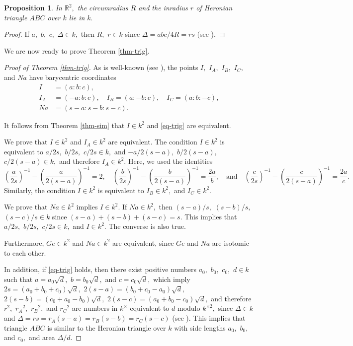 \documentclass{article}
\theoremstyle{definition}
\theoremstyle{plain}
\newtheorem{prop}{Proposition}
\newenvironment{pf}{\begin{proof}}{\end{proof}}
\begin{document}
\begin{prop}
In $\mathbb R^2,$ the circumradius $R$ and the inradius $r$ of Heronian triangle $ABC$ over $k$ lie in $k.$
\end{prop}
\begin{pf}
If $a,$ $b,$ $c,$ $\Delta \in k,$ then $R,$ $r \in k$ since $\Delta = abc/4R = rs$ (see \cite[Section 1.5]{Cox89}).\qedhere
\end{pf}
We are now ready to prove Theorem \ref{thm-trig}.
\begin{pf}[Proof of Theorem \ref{thm-trig}]
As is well-known (see \cite{ETC}), the points $I,$ $I_A,$ $I_B,$ $I_C,$ and $Na$ have barycentric coordinates 
\begin{align*} 
I &= (a:b:c), \\ 
I_A &= (-a:b:c), \quad I_B = (a:-b:c), \quad I_C = (a:b:-c), \\ 
Na & = (s-a:s-b:s-c). 
\end{align*}\par
It follows from Theorem \ref{thm-sim} that $I \in k^2$ and \eqref{eq-trig} are equivalent.\par
We prove that $I \in k^2$ and $I_A \in k^2$ are equivalent. 
The condition $I \in k^2$ is equivalent to $a/2s,$ $b/2s,$ $c/2s \in k,$ and $-a/2(s-a),$ $b/2(s-a),$ $c/2(s-a) \in k,$ and therefore $I_A \in k^2.$ 
Here, we used the identities 
\[\left(\frac{a}{2s}\right) ^{-1}-\left(\frac{a}{2(s-a)}\right) ^{-1} = 2, \quad \left(\frac{b}{2s}\right) ^{-1}-\left(\frac{b}{2(s-a)}\right) ^{-1} = \frac{2a}{b}, \quad\text{and}\quad \left(\frac{c}{2s}\right) ^{-1}-\left(\frac{c}{2(s-a)}\right) ^{-1} = \frac{2a}{c}.\] 
Similarly, the condition $I \in k^2$ is equivalent to $I_B \in k^2,$ and $I_C \in k^2.$\par
We prove that $Na \in k^2$ implies $I \in k^2.$ 
If $Na \in k^2,$ then $(s-a)/s,$ $(s-b)/s,$ $(s-c)/s \in k$ since $(s-a)+(s-b)+(s-c) = s.$ 
This implies that $a/2s,$ $b/2s,$ $c/2s \in k,$ and $I \in k^2.$ 
The converse is also true.\par
Furthermore, $Ge \in k^2$ and $Na \in k^2$ are equivalent, since $Ge$ and $Na$ are isotomic to each other.\par
In addition, if \eqref{eq-trig} holds, then there exist positive numbers $a_0,$ $b_0,$ $c_0,$ $d \in k$ such that $a = a_0\sqrt d,$ $b = b_0\sqrt d,$ and $c = c_0\sqrt d,$ which imply $2s = (a_0+b_0+c_0)\sqrt d,$ $2(s-a) = (b_0+c_0-a_0)\sqrt d,$ $2(s-b) = (c_0+a_0-b_0)\sqrt d,$ $2(s-c) = (a_0+b_0-c_0)\sqrt d,$ and therefore $r^2,$ $r_A{}^2,$ $r_B{}^2,$ and $r_C{}^2$ are numbers in $k^\times$ equivalent to $d$ modulo $k^{\times 2},$ since $\Delta \in k$ and $\Delta = rs = r_A(s-a) = r_B(s-b) = r_C(s-c)$ (see \cite[Section 1.5]{Cox89}).  
This implies that triangle $ABC$ is similar to the Heronian triangle over $k$ with side lengths $a_0,$ $b_0,$ and $c_0,$ and area $\Delta /d.$
\end{pf}
\end{document}
